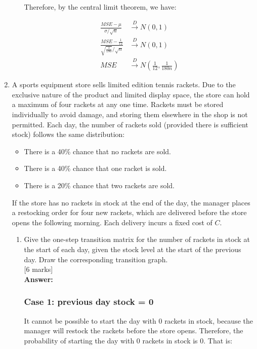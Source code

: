 \documentclass[12pt]{article}
\begin{document}
\begin{enumerate}
\begin{enumerate}
Therefore, by the central limit theorem, we have:

\begin{align*}
\frac{MSE - \mu}{\sigma/\sqrt{n}} &\xrightarrow{D} N(0, 1) \\
\frac{MSE - \frac{1}{12}}{\sqrt{\frac{1}{180}}/\sqrt{n}} &\xrightarrow{D} N(0, 1) \\
MSE &\xrightarrow{D} N\left(\frac{1}{12}, \frac{1}{180n}\right)
\end{align*}

\end{enumerate}

\vspace{5pt}
\item A sports equipment store sells limited edition tennis rackets. Due to the exclusive nature of the product and limited display space, the store can hold a maximum of four rackets at any one time. Rackets must be stored individually to avoid damage, and storing them elsewhere in the shop is not permitted.
%
Each day, the number of rackets sold (provided there is sufficient stock) follows the same distribution:
\begin{itemize}
	\item There is a 40\% chance that no rackets are sold.
	\item There is a 40\% chance that one racket is sold.
	\item There is a 20\% chance that two rackets are sold.
	\end{itemize}
%
If the store has no rackets in stock at the end of the day, the manager places a restocking order for four new rackets, which are delivered before the store opens the following morning. Each delivery incurs a fixed cost of $C$.  
%
\begin{enumerate}
\item Give the one-step transition matrix for the number of rackets in stock at the start of each day, given the stock level at the start of the previous day. Draw the corresponding transition graph. 
			\\\phantom{1}\hfill [6 marks]
%
\\
\textbf{Answer:}
\\
\subsubsection*{Case 1: previous day stock = 0}

It cannot be possible to start the day with 0 rackets in stock, because the manager will restock the rackets before the store opens. Therefore, the probability of starting the day with 0 rackets in stock is 0. That is:


\end{enumerate}
\end{enumerate}
\end{document}
